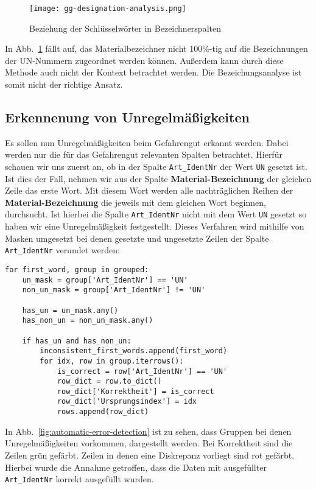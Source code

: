 \begin{figure}[htbp]
  \centering
  \texttt{[image: gg-designation-analysis.png]}
  \caption{Beziehung der Schlüsselwörter in Bezeichnerspalten}
  \label{fig:designation}
\end{figure}

In Abb.~\ref{fig:designation} fällt auf, das Materialbezeichner nicht
100\%-tig auf die Bezeichnungen der UN-Nummern zugeordnet werden können.
Außerdem kann durch diese Methode auch nicht der Kontext betrachtet werden.
Die Bezeichungsanalyse ist somit nicht der richtige Ansatz.

\newpage

\subsection{Erkennenung von Unregelmäßigkeiten}

Es sollen nun Unregelmäßigkeiten beim Gefahrengut erkannt werden. Dabei werden
nur die für das Gefahrengut relevanten Spalten betrachtet. Hierfür schauen wir
uns zuerst an, ob in der Spalte \texttt{Art\_IdentNr} der Wert \texttt{UN}
gesetzt ist. Ist dies der Fall, nehmen wir aus der Spalte
\textbf{Material-Bezeichnung} der gleichen Zeile das erste Wort. Mit diesem Wort
werden alle nachträglichen Reihen der \textbf{Material-Bezeichnung} die jeweils
mit dem gleichen Wort beginnen, durchsucht. Ist hierbei die Spalte
\texttt{Art\_IdentNr} nicht mit dem Wert \texttt{UN} gesetzt so haben wir eine
Unregelmäßigkeit festgestellt. Dieses Verfahren wird mithilfe von Masken
umgesetzt bei denen gesetzte und ungesetzte Zeilen der Spalte
\texttt{Art\_IdentNr} verundet werden:\\

\begin{lstlisting}
for first_word, group in grouped:
    un_mask = group['Art_IdentNr'] == 'UN'
    non_un_mask = group['Art_IdentNr'] != 'UN'

    has_un = un_mask.any()
    has_non_un = non_un_mask.any()

    if has_un and has_non_un:
        inconsistent_first_words.append(first_word)
        for idx, row in group.iterrows():
            is_correct = row['Art_IdentNr'] == 'UN'
            row_dict = row.to_dict()
            row_dict['Korrektheit'] = is_correct
            row_dict['Ursprungsindex'] = idx  
            rows.append(row_dict)
\end{lstlisting}

In Abb.~\ref{fig:automatic-error-detection} ist zu sehen, dass Gruppen bei denen
Unregelmäßigkeiten vorkommen, dargestellt werden. Bei Korrektheit sind die
Zeilen grün gefärbt. Zeilen in denen eine Diskrepanz vorliegt sind rot gefärbt.
Hierbei wurde die Annahme getroffen, dass die Daten mit ausgefüllter
\texttt{Art\_IdentNr} korrekt ausgefüllt wurden.

